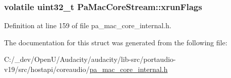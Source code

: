 \subsubsection[{\texorpdfstring{xrun\+Flags}{xrunFlags}}]{\setlength{\rightskip}{0pt plus 5cm}volatile {\bf uint32\+\_\+t} Pa\+Mac\+Core\+Stream\+::xrun\+Flags}\hypertarget{struct_pa_mac_core_stream_af65db3bdd18d4356f16fe5c2b23f7d5d}{}\label{struct_pa_mac_core_stream_af65db3bdd18d4356f16fe5c2b23f7d5d}


Definition at line 159 of file pa\+\_\+mac\+\_\+core\+\_\+internal.\+h.



The documentation for this struct was generated from the following file\+:\begin{DoxyCompactItemize}
\item 
C\+:/\+\_\+dev/\+Open\+U/\+Audacity/audacity/lib-\/src/portaudio-\/v19/src/hostapi/coreaudio/\hyperlink{pa__mac__core__internal_8h}{pa\+\_\+mac\+\_\+core\+\_\+internal.\+h}\end{DoxyCompactItemize}
